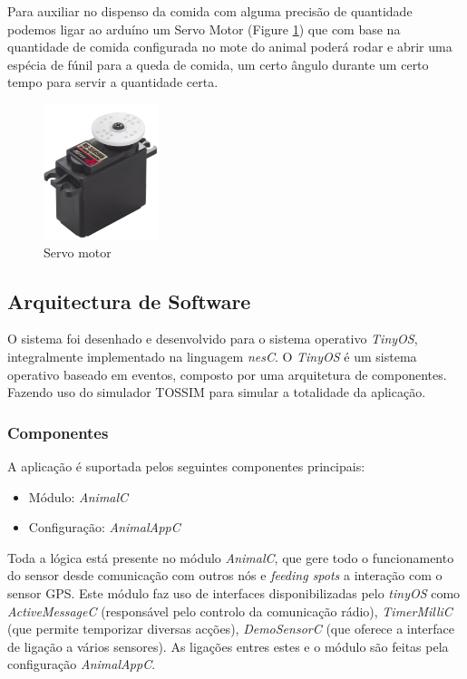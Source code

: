 \documentclass[times,10pt,twocolumn]{article}
\begin{document}
Para auxiliar no dispenso da comida com alguma precisão de quantidade podemos ligar ao arduíno um Servo Motor (Figure \ref{fig:servo}) que com base na quantidade de comida configurada no mote do animal poderá rodar e abrir uma espécia de fúnil para a queda de comida, um certo ângulo durante um certo tempo para servir a quantidade certa.

\begin{figure}[h]
	\centering
	\includegraphics[width=0.30\textwidth]{servo.jpg}	
	\caption{Servo motor}
	\label{fig:servo}
\end{figure}
	
\subsection{Arquitectura de Software}

O sistema foi desenhado e desenvolvido para o sistema operativo \textit{TinyOS}, integralmente implementado na linguagem \textit{nesC}. O \textit{TinyOS} é um sistema operativo baseado em eventos, composto por uma arquitetura de componentes. Fazendo uso do simulador TOSSIM para simular a totalidade da aplicação. 
		
\subsubsection{Componentes}
	
A aplicação é suportada pelos seguintes componentes principais:

\begin{itemize}
	\item Módulo: \textit{AnimalC} 
	\item Configuração: \textit{AnimalAppC}
\end{itemize}	

Toda a lógica está presente no módulo \textit{AnimalC}, que gere todo o funcionamento do sensor desde comunicação com outros nós e \textit{feeding spots} a interação com o sensor GPS. Este módulo faz uso de interfaces disponibilizadas pelo \emph{tinyOS} como \emph{ActiveMessageC} (responsável pelo controlo da comunicação rádio), \emph{TimerMilliC} (que permite temporizar diversas acções), \emph{DemoSensorC} (que oferece a interface de ligação a vários sensores). As ligações entres estes e o módulo são feitas pela configuração \emph{AnimalAppC}.
\end{document}
